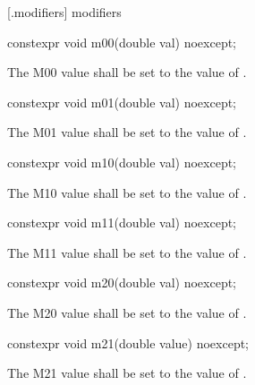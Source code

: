  [\matrixtwod.modifiers] { modifiers}

\begin{itemdecl}
constexpr void m00(double val) noexcept;
\end{itemdecl}
\begin{itemdescr}
\pnum
\effects
The M00 value shall be set to the value of .
\end{itemdescr}

\begin{itemdecl}
constexpr void m01(double val) noexcept;
\end{itemdecl}
\begin{itemdescr}
\pnum
\effects
The M01 value shall be set to the value of .
\end{itemdescr}

\begin{itemdecl}
constexpr void m10(double val) noexcept;
\end{itemdecl}
\begin{itemdescr}
\pnum
\effects
The M10 value shall be set to the value of .
\end{itemdescr}

\begin{itemdecl}
constexpr void m11(double val) noexcept;
\end{itemdecl}
\begin{itemdescr}
\pnum
\effects
The M11 value shall be set to the value of .
\end{itemdescr}

\begin{itemdecl}
constexpr void m20(double val) noexcept;
\end{itemdecl}
\begin{itemdescr}
\pnum
\effects
The M20 value shall be set to the value of .
\end{itemdescr}

\begin{itemdecl}
constexpr void m21(double value) noexcept;
\end{itemdecl}
\begin{itemdescr}
\pnum
\effects
The M21 value shall be set to the value of .
\end{itemdescr}


